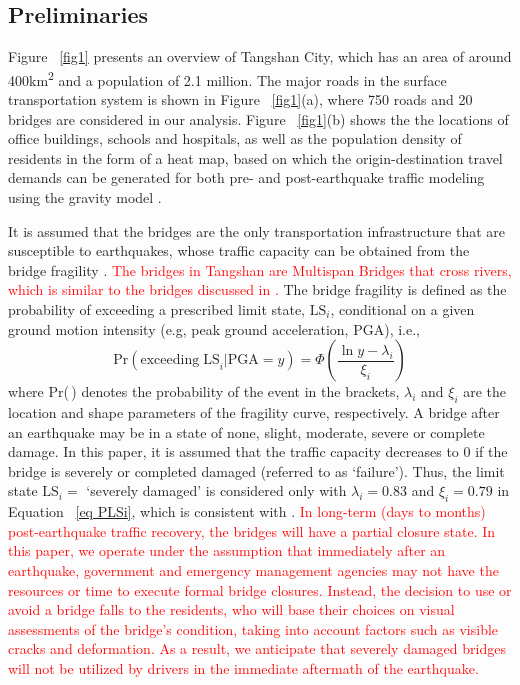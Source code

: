 \documentclass[review,11pt,nonatbib]{elsarticle}
\begin{document}
\subsection{Preliminaries}
Figure ~\ref{fig1} presents an overview of Tangshan City, which has an area of around 400km\textsuperscript{2} and a population of 2.1 million. The major roads in the surface transportation system is shown in Figure ~\ref{fig1}(a), where 750 roads and 20 bridges are considered in our analysis. Figure ~\ref{fig1}(b) shows the the locations of office buildings, schools and hospitals, as well as the population density of residents in the form of a heat map, based on which the origin-destination travel demands can be generated for both pre- and post-earthquake traffic modeling using the gravity model \citep{moriarty2007modeling,chang2012post}.
\par  It is assumed that the bridges are the only transportation infrastructure that are susceptible to earthquakes, whose traffic capacity can be obtained from the bridge fragility \citep{padgett2009retrofitted}. \textcolor{red}{The bridges in Tangshan are Multispan Bridges that cross rivers, which is similar to the bridges discussed in \citet {padgett2009retrofitted}.} The bridge fragility is defined as the probability of exceeding a prescribed limit state, $\mathrm{LS}_i$, conditional on a given ground motion intensity (e.g, peak ground acceleration, PGA), i.e.,
\begin{equation}\label{eq PLSi}
\mathrm{Pr}(\mathrm{exceeding\;LS}_i|\mathrm{PGA}=y)=\Phi\left(\frac{\ln y - \lambda_i}{\xi_i}\right)
\end{equation}
where Pr(\,) denotes the probability of the event in the brackets, $\lambda_i$ and $\xi_i$ are the location and shape parameters of the fragility curve, respectively. A bridge after an earthquake may be in a state of none, slight, moderate, severe or complete damage. In this paper, it is assumed that the traffic capacity decreases to 0 if the bridge is severely or completed damaged (referred to as `failure'). Thus, the limit state $\mathrm{LS}_i=$ `severely damaged' is considered only with $\lambda_i=0.83$ and $\xi_i=0.79$ in Equation ~\eqref{eq PLSi}, which is consistent with \citep{Wu2014Calibration}. \textcolor{red}{In long-term (days to months) post-earthquake traffic recovery, the bridges will have a partial closure state. In this paper, we operate under the assumption that immediately after an earthquake, government and emergency management agencies may not have the resources or time to execute formal bridge closures. Instead, the decision to use or avoid a bridge falls to the residents, who will base their choices on visual assessments of the bridge's condition, taking into account factors such as visible cracks and deformation. As a result, we anticipate that severely damaged bridges will not be utilized by drivers in the immediate aftermath of the earthquake. }
\end{document}
